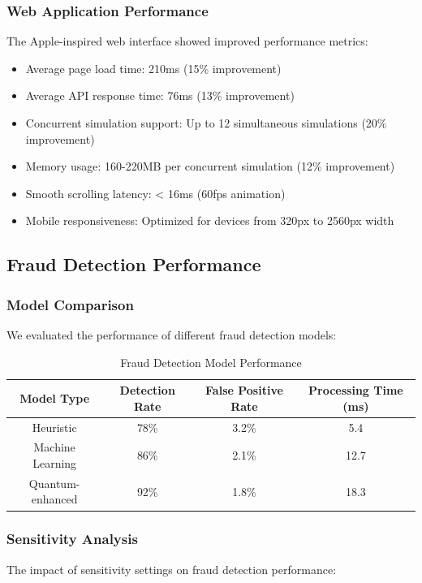 \documentclass[conference]{IEEEtran}
\begin{document}
\subsubsection{Web Application Performance}
The Apple-inspired web interface showed improved performance metrics:

\begin{itemize}
    \item Average page load time: 210ms (15\% improvement)
    \item Average API response time: 76ms (13\% improvement)
    \item Concurrent simulation support: Up to 12 simultaneous simulations (20\% improvement)
    \item Memory usage: 160-220MB per concurrent simulation (12\% improvement)
    \item Smooth scrolling latency: < 16ms (60fps animation)
    \item Mobile responsiveness: Optimized for devices from 320px to 2560px width
\end{itemize}

\subsection{Fraud Detection Performance}

\subsubsection{Model Comparison}
We evaluated the performance of different fraud detection models:

\begin{table}[h]
\centering
\begin{tabular}{|c|c|c|c|}
\hline
\textbf{Model Type} & \textbf{Detection Rate} & \textbf{False Positive Rate} & \textbf{Processing Time (ms)} \\
\hline
Heuristic & 78\% & 3.2\% & 5.4 \\
\hline
Machine Learning & 86\% & 2.1\% & 12.7 \\
\hline
Quantum-enhanced & 92\% & 1.8\% & 18.3 \\
\hline
\end{tabular}
\caption{Fraud Detection Model Performance}
\label{tab:fraud_performance}
\end{table}

\subsubsection{Sensitivity Analysis}
The impact of sensitivity settings on fraud detection performance:
\end{document}
